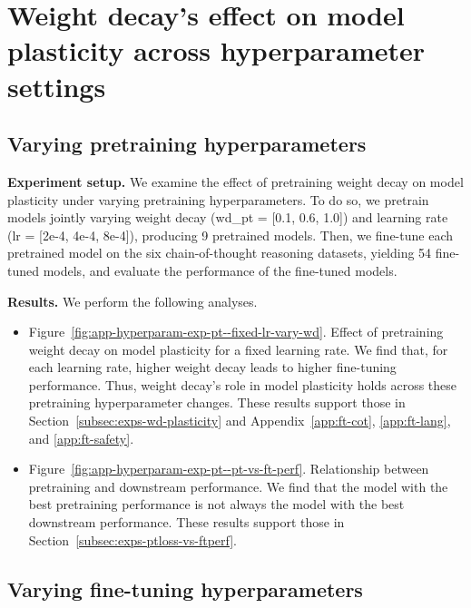 \clearpage
\section{Weight decay’s effect on model plasticity across hyperparameter settings}
\label{app:hyperparam-exps}


\subsection{Varying pretraining hyperparameters}
\label{app:hyperparam-exps-pt}


\textbf{Experiment setup.} 
We examine the effect of pretraining weight decay on model plasticity under varying pretraining hyperparameters. To do so, we pretrain \olmoonex{} models jointly varying weight decay (wd\_pt = [0.1, 0.6, 1.0]) and learning rate (lr = [2e-4, 4e-4, 8e-4]), producing 9 pretrained models. Then, we fine-tune each pretrained model on the six chain-of-thought reasoning datasets, yielding 54 fine-tuned models, and evaluate the performance of the fine-tuned models.


\textbf{Results.} 
We perform the following analyses.

\begin{itemize}
    \item Figure~\ref{fig:app-hyperparam-exp-pt--fixed-lr-vary-wd}. Effect of pretraining weight decay on model plasticity for a fixed learning rate. We find that, for each learning rate, higher weight decay leads to higher fine-tuning performance. Thus, weight decay's role in model plasticity holds across these pretraining hyperparameter changes. These results support those in Section~\ref{subsec:exps-wd-plasticity} and Appendix~\ref{app:ft-cot}, \ref{app:ft-lang}, and \ref{app:ft-safety}.
    
    \item Figure~\ref{fig:app-hyperparam-exp-pt--pt-vs-ft-perf}. Relationship between pretraining and downstream performance. We find that the model with the best pretraining performance is not always the model with the best downstream performance. These results support those in Section~\ref{subsec:exps-ptloss-vs-ftperf}.
\end{itemize}



\subsection{Varying fine-tuning hyperparameters}
\label{app:hyperparam-exps-ft}

